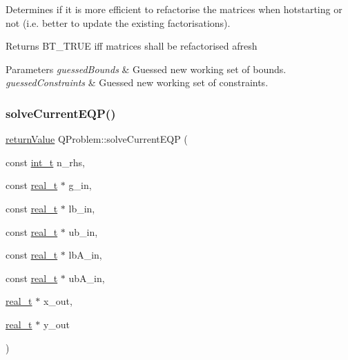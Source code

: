 Determines if it is more efficient to refactorise the matrices when hotstarting or not (i.\+e. better to update the existing factorisations). \begin{DoxyReturn}{Returns}
B\+T\+\_\+\+T\+R\+UE iff matrices shall be refactorised afresh 
\end{DoxyReturn}

\begin{DoxyParams}{Parameters}
{\em guessed\+Bounds} & Guessed new working set of bounds. \\
\hline
{\em guessed\+Constraints} & Guessed new working set of constraints. \\
\hline
\end{DoxyParams}
\mbox{\label{class_q_problem_a41c193e651a37e84e8b3eec0d5c44f46}} 
\subsubsection{\texorpdfstring{solve\+Current\+E\+Q\+P()}{solveCurrentEQP()}}
{\footnotesize\ttfamily \hyperlink{_message_handling_8hpp_a81d556f613bfbabd0b1f9488c0fa865e}{return\+Value} Q\+Problem\+::solve\+Current\+E\+QP (\begin{DoxyParamCaption}\item[{const \hyperlink{_types_8hpp_ab6fd6105e64ed14a0c9281326f05e623}{int\+\_\+t}}]{n\+\_\+rhs,  }\item[{const \hyperlink{qp_o_a_s_e_s__wrapper_8h_a0d00e2b3dfadee81331bbb39068570c4}{real\+\_\+t} $\ast$}]{g\+\_\+in,  }\item[{const \hyperlink{qp_o_a_s_e_s__wrapper_8h_a0d00e2b3dfadee81331bbb39068570c4}{real\+\_\+t} $\ast$}]{lb\+\_\+in,  }\item[{const \hyperlink{qp_o_a_s_e_s__wrapper_8h_a0d00e2b3dfadee81331bbb39068570c4}{real\+\_\+t} $\ast$}]{ub\+\_\+in,  }\item[{const \hyperlink{qp_o_a_s_e_s__wrapper_8h_a0d00e2b3dfadee81331bbb39068570c4}{real\+\_\+t} $\ast$}]{lb\+A\+\_\+in,  }\item[{const \hyperlink{qp_o_a_s_e_s__wrapper_8h_a0d00e2b3dfadee81331bbb39068570c4}{real\+\_\+t} $\ast$}]{ub\+A\+\_\+in,  }\item[{\hyperlink{qp_o_a_s_e_s__wrapper_8h_a0d00e2b3dfadee81331bbb39068570c4}{real\+\_\+t} $\ast$}]{x\+\_\+out,  }\item[{\hyperlink{qp_o_a_s_e_s__wrapper_8h_a0d00e2b3dfadee81331bbb39068570c4}{real\+\_\+t} $\ast$}]{y\+\_\+out }\end{DoxyParamCaption})}

